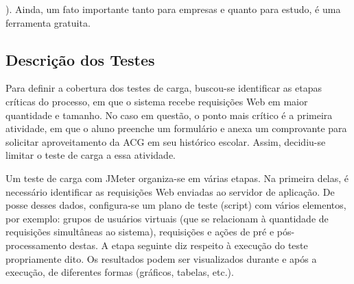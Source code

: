 \documentclass[12pt]{article}
\begin{document}
). Ainda, um fato importante tanto para empresas e quanto para estudo, é uma ferramenta gratuita.


\subsection{Descrição dos Testes}



Para definir a cobertura dos testes de carga, buscou-se identificar as etapas críticas do processo, em que o sistema recebe requisições Web em maior quantidade e tamanho. No caso em questão, o ponto mais crítico é a primeira atividade, em que o aluno preenche um formulário e anexa um comprovante para solicitar aproveitamento da ACG em seu histórico escolar. Assim, decidiu-se limitar o teste de carga a essa atividade.




Um teste de carga com JMeter organiza-se em várias etapas. Na primeira delas, é necessário identificar as requisições Web enviadas ao servidor de aplicação. De posse desses dados, configura-se um plano de teste (script) com vários elementos, por exemplo: grupos de usuários virtuais (que se relacionam à quantidade de requisições simultâneas ao sistema), requisições e ações de pré e pós-processamento destas. A etapa seguinte diz respeito à execução do teste propriamente dito. Os resultados podem ser visualizados durante e após a execução, de diferentes formas (gráficos, tabelas, etc.).
\end{document}
